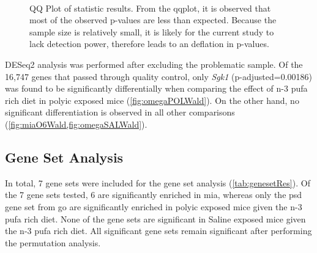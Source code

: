 \documentclass[12pt]{scrbook}
\begin{document}
\begin{figure}
{		\label{fig:omegaSALWald}
	}\\
		\caption[QQ Plot Statistic Results]
	{QQ Plot of statistic results.
		From the \gls{qqplot}, it is observed that most of the observed p-values are less than expected. 
		Because the sample size is relatively small, it is likely for the current study to lack detection power, therefore leads to an deflation in p-values.
	} 
	\label{fig:waldQQ}
\end{figure}
DESeq2 analysis was performed after excluding the problematic sample.
Of the 16,747 genes that passed through quality control, only \textit{Sgk1} (p-adjusted=0.00186) was found to be significantly differentially when comparing the effect of n-3 \gls{pufa} rich diet in \gls{polyic} exposed mice (\cref{fig:omegaPOLWald}).
On the other hand, no significant differentiation is observed in all other comparisons (\cref{fig:miaO6Wald,fig:omegaSALWald}).
	

\subsection{Gene Set Analysis}
In total, 7 gene sets were included for the gene set analysis (\cref{tab:genesetRes}).
Of the 7 gene sets tested, 6 are significantly enriched in \gls{mia}, whereas only the \gls{psd} gene set from \gls{go} are significantly enriched in \gls{polyic} exposed mice given the n-3 \gls{pufa} rich diet.
None of the gene sets are significant in Saline exposed mice given the n-3 \gls{pufa} rich diet. 
All significant gene sets remain significant after performing the permutation analysis. 
\end{document}
